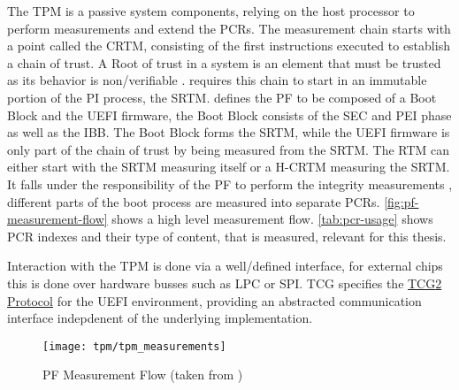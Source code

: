 The \ac{TPM} is a passive system components, relying on the host processor to perform measurements and extend the \acp{PCR}.
The measurement chain starts with a point called the \ac{CRTM}, consisting of the first instructions executed to establish a chain of trust.
A Root of trust in a system is an element that must be trusted as its behavior is non\-/verifiable \cite{tcg-tpm-library-part1-architecture}.
\cite[3.2.2]{tcg-pc-client-platform-firmware-profile-spec} requires this chain to start in an immutable portion of the \ac{PI} process, the \ac{SRTM}.
\cite[3.2.3.1]{tcg-pc-client-platform-firmware-profile-spec} defines the \ac{PF} to be composed of a Boot Block and the \ac{UEFI} firmware, the Boot Block consists of the \ac{SEC} and \ac{PEI} phase as well as the \ac{IBB}.
The Boot Block forms the \ac{SRTM}, while the \ac{UEFI} firmware is only part of the chain of trust by being measured from the \ac{SRTM}.
The \ac{RTM} can either start with the \ac{SRTM} measuring itself or a \ac{H-CRTM} measuring the \ac{SRTM}.
It falls under the responsibility of the \ac{PF} to perform the integrity measurements \cite{tcg-pc-client-platform-firmware-profile-spec}, different parts of the boot process are measured into separate \acp{PCR}.
\autoref{fig:pf-measurement-flow} shows a high level measurement flow.
\autoref{tab:pcr-usage} shows \ac{PCR} indexes and their type of content, that is measured, relevant for this thesis.

Interaction with the \ac{TPM} is done via a well\-/defined interface, for external chips this is done over hardware busses such as \ac{LPC} or \ac{SPI}.
\ac{TCG} specifies the \hyperref[lst:tcg2-protocol]{\ac{TCG}2 Protocol} for the \ac{UEFI} environment, providing an abstracted communication interface indepdenent of the underlying implementation.

\begin{figure}[htb]
    \centering
    \texttt{[image: tpm/tpm\_measurements]}
    \caption{\ac{PF} Measurement Flow (taken from \cite[Figure 3]{tianocore-trusted-boot-chain})}
    \label{fig:pf-measurement-flow}
\end{figure}

